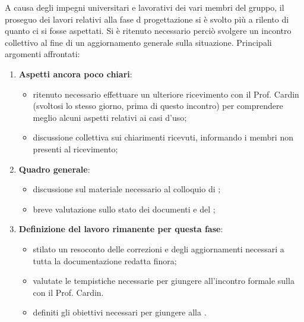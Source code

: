 A causa degli impegni universitari e lavorativi dei vari  membri del gruppo, il proseguo dei lavori relativi alla fase d progettazione si è svolto più a rilento di quanto ci si fosse aspettati. Si è ritenuto necessario perciò svolgere un incontro collettivo al fine di un aggiornamento generale sulla situazione.
Principali argomenti affrontati:
\begin{enumerate}
    \item \textbf{Aspetti ancora poco chiari}:
        \begin{itemize}
            \item ritenuto necessario effettuare un ulteriore ricevimento con il Prof. Cardin (svoltosi lo stesso giorno, prima di questo incontro) per comprendere meglio alcuni aspetti relativi ai casi d'uso;
            \item discussione collettiva sui chiarimenti ricevuti, informando i membri non presenti al ricevimento;
        \end{itemize}
    \item \textbf{Quadro generale}:
        \begin{itemize}
            \item discussione sul materiale necessario al colloquio di ;
            \item breve valutazione sullo stato dei documenti e del ; 
        \end{itemize}
    \item \textbf{Definizione del lavoro rimanente per questa fase}:
        \begin{itemize}
            \item stilato un resoconto delle correzioni e degli aggiornamenti necessari a tutta la documentazione redatta finora;
            \item valutate le tempistiche necessarie per giungere all'incontro formale sulla  con il Prof. Cardin.
            \item definiti gli obiettivi necessari per giungere alla \RP.
        \end{itemize}
\end{enumerate}